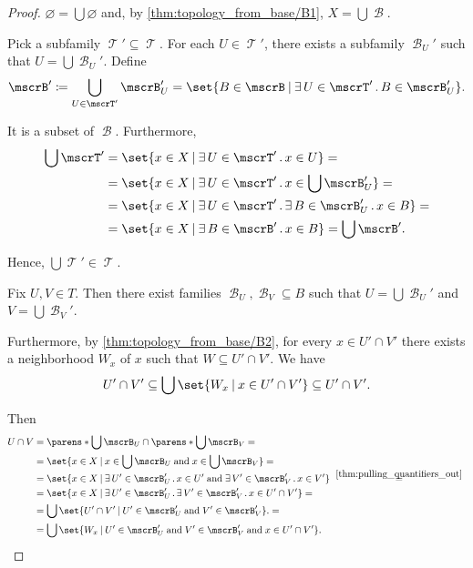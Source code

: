 \begin{proof}

   \( \varnothing = \bigcup \varnothing \) and, by \ref{thm:topology_from_base/B1}, \( X = \bigcup \mscrB \).

   Pick a subfamily \( \mscrT' \subseteq \mscrT \). For each \( U \in \mscrT' \), there exists a subfamily \( \mscrB_U' \) such that \( U = \bigcup \mscrB_U' \). Define
  \begin{equation*}
    \mscrB'
    \coloneqq
    \bigcup_{U \in \mscrT'} \mscrB_U'
    =
    \set{ B \in \mscrB \given \qexists {U \in \mscrT'} B \in \mscrB_U' }.
  \end{equation*}

  It is a subset of \( \mscrB \). Furthermore,
  \begin{align*}
    \bigcup \mscrT'
    &=
    \set{ x \in X \given \qexists{U \in \mscrT'} x \in U }
    = \\ &=
    \set{ x \in X \given \qexists{U \in \mscrT'} x \in \bigcup \mscrB_U' }
    = \\ &=
    \set{ x \in X \given \qexists{U \in \mscrT'} \qexists{B \in \mscrB_U'} x \in B }
    = \\ &=
    \set{ x \in X \given \qexists{B \in \mscrB'} x \in B }
    =
    \bigcup \mscrB'.
  \end{align*}

  Hence, \( \bigcup\mscrT' \in \mscrT \).

   Fix \( U, V \in T \). Then there exist families \( \mscrB_U, \mscrB_V \subseteq B \) such that \( U = \bigcup \mscrB_U' \) and \( V = \bigcup \mscrB_V' \).

  Furthermore, by \ref{thm:topology_from_base/B2}, for every \( x \in U' \cap V' \) there exists a neighborhood \( W_x \) of \( x \) such that \( W \subseteq U' \cap V' \). We have
  \begin{equation*}
    U' \cap V' \subseteq \bigcup\set{ W_x \given x \in U' \cap V' } \subseteq U' \cap V'.
  \end{equation*}

  Then
  \begin{align*}
    U \cap V
    &=
    \parens*{ \bigcup \mscrB_U } \cap \parens*{ \bigcup \mscrB_V }
    = \\ &=
    \set{ x \in X \given x \in \bigcup \mscrB_U \T{and} x \in \bigcup \mscrB_V }
    = \\ &=
    \set{ x \in X \given \qexists{ U' \in \mscrB_U' } x \in U' \T{and} \qexists{ V' \in \mscrB_V' } x \in V' }
    \reloset {\ref{thm:pulling_quantifiers_out}} = \\ &=
    \set{ x \in X \given \qexists{ U' \in \mscrB_U' } \qexists{ V' \in \mscrB_V' } x \in U' \cap V' }
    = \\ &=
    \bigcup\set{ U' \cap V' \given U' \in \mscrB_U' \T{and} V' \in \mscrB_V' }.
    = \\ &=
    \bigcup\set{ W_x \given U' \in \mscrB_U' \T{and} V' \in \mscrB_V' \T{and} x \in U' \cap V' }.
  \end{align*}


\end{proof}

